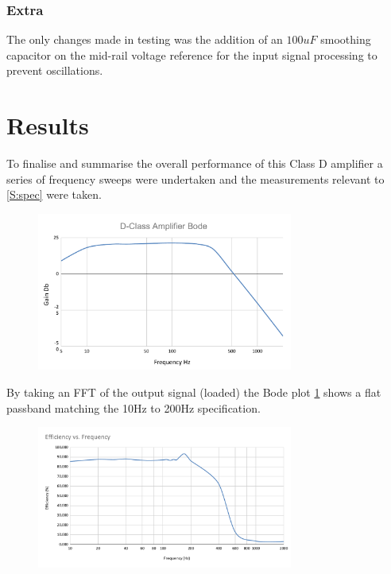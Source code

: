 \documentclass[11pt]{article}
\begin{document}
{\subsubsection*{Extra}
The only changes made in testing was the addition of an $100uF$ smoothing capacitor on the mid-rail voltage reference for the input signal processing to prevent oscillations. 

\newpage
\section{Results}

To finalise and summarise the overall performance of this Class D amplifier a series of frequency sweeps were undertaken and the measurements relevant to \cref{S:spec} were taken. 

\begin{figure}[h!]
  \centering
  \includegraphics[width=0.75\textwidth]{img/testing/amplifier_bode.pdf}
  \caption{}
  \label{F:bode}
\end{figure}

By taking an FFT of the output signal (loaded) the Bode plot \cref{F:bode} shows a flat passband matching the 10Hz to 200Hz specification.

\begin{figure}[h!]
  \centering
  \includegraphics[width=0.75\textwidth]{img/testing/Efficiency_vs._Frequency.pdf}
  \caption{}
  \label{F:eff}
\end{figure}

}
\end{document}
